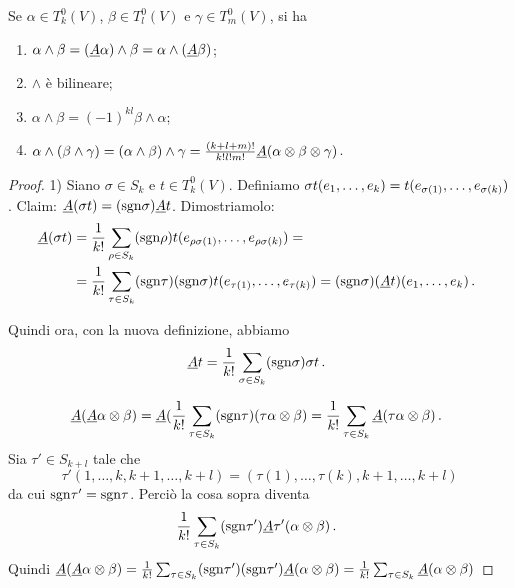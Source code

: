 \begin{proposition}
	Se $\alpha \in T^0_k(V)$, $\beta \in T^0_l(V)$ e $\gamma \in T^0_m(V)$, si ha
	\begin{enumerate}
		\item $\alpha\wedge\beta = (\antisimm \alpha) \wedge \beta = \alpha\wedge (\antisimm \beta)$;
		\item $\wedge$ è bilineare;
		\item $\alpha\wedge \beta = (-1)^{kl} \beta \wedge \alpha$;
		\item $\alpha\wedge(\beta\wedge \gamma) = (\alpha\wedge\beta)\wedge\gamma = \frac{(k+l+m)!}{k!l!m!}\antisimm(\alpha\otimes\beta\otimes\gamma)$.
	\end{enumerate}
\end{proposition}
\begin{proof}
	1)
	Siano $\sigma \in S_k$ e $t\in T^0_k(V)$. Definiamo $\sigma t(\seqb{e}{k}{,}) = t(e_{\sigma(1)}, \ldots, e_{\sigma(k)})$.
	Claim: $\antisimm (\sigma t) = (\sgn \sigma) \antisimm t$.
	Dimostriamolo:
	\begin{align*}
		\antisimm (\sigma t) &= \frac 1{k!} \sum_{\rho \in S_k} (\sgn \rho) t(e_{\rho\sigma (1)},\ldots,e_{\rho\sigma(k)}) =\\
		&= \frac 1{k!} \sum_{\tau\in S_k} (\sgn\tau)(\sgn\sigma) t(e_{\tau(1)}, \ldots, e_{\tau(k)}) = (\sgn\sigma) (\antisimm t)(\seqb{e}{k}{,})\punto
	\end{align*}
	
	Quindi ora, con la nuova definizione, abbiamo
	\begin{equation*}
		\antisimm t = \frac 1{k!} \sum_{\sigma\in S_k} (\sgn\sigma) \sigma t \punto
	\end{equation*}

	\begin{equation*}
		\antisimm(\antisimm \alpha \otimes \beta) = \antisimm(\frac 1{k!} \sum_{\tau\in S_k} (\sgn\tau) (\tau\alpha \otimes \beta) =
		\frac 1{k!} \sum_{\tau\in S_k} \antisimm(\tau\alpha\otimes \beta)\punto
	\end{equation*}
	Sia $\tau'\in S_{k+l}$ tale che
	\begin{equation*}
		\tau'(1,\ldots,k,k+1,\ldots,k+l) = (\tau(1),\ldots,\tau(k),k+1,\ldots,k+l)
	\end{equation*}
	da cui $\sgn\tau'=\sgn\tau$.
	Perciò la cosa sopra diventa
	\begin{equation*}
		\frac 1{k!} \sum_{\tau\in S_k} (\sgn\tau')\antisimm\tau'(\alpha\otimes \beta)\punto
	\end{equation*}
	Quindi $\antisimm(\antisimm\alpha\otimes \beta) = \frac 1{k!} \sum_{\tau\in S_k} (\sgn\tau')(\sgn\tau')\antisimm(\alpha\otimes \beta)=\frac 1{k!} \sum_{\tau\in S_k} \antisimm(\alpha\otimes \beta)$


\end{proof}
